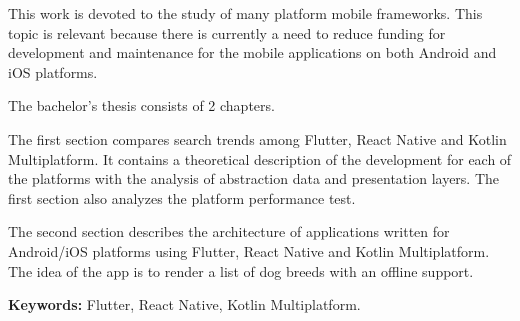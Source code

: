 This work is devoted to the study of many platform mobile frameworks.
This topic is relevant because there is currently a need to reduce funding for development and maintenance for the
mobile applications on both Android and iOS platforms.

The bachelor's thesis consists of 2 chapters.

The first section compares search trends among Flutter, React Native and Kotlin Multiplatform.
It contains a theoretical description of the development for each of the platforms with the analysis of abstraction data and presentation layers.
The first section also analyzes the platform performance test.

The second section describes the architecture of applications written for Android/iOS platforms using
Flutter, React Native and Kotlin Multiplatform. The idea of the app is to render a list of dog breeds with an
offline support.

{\bf Keywords:} Flutter, React Native, Kotlin Multiplatform.


